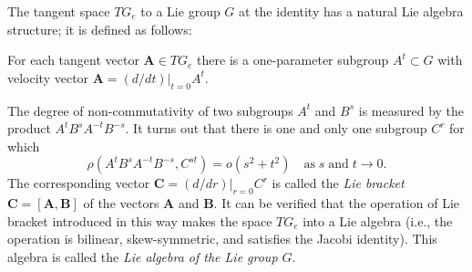 \documentclass[leqno]{report}
\numberwithin{equation}{section}
\theoremstyle{plain}
\theoremstyle{definition}
\theoremstyle{remark}
\theoremstyle{smallcap}
\numberwithin{prob}{section}
\begin{document}
The tangent space $TG_e$ to a Lie group $G$
at the identity has a natural Lie algebra structure;
it is defined as follows:

For each tangent vector $\mathbf A \in TG_e$
there is a one-parameter subgroup $A^t \subset G$
with velocity vector $\mathbf A = (d/dt)|_{t = 0} A^t$.

The degree of non-commutativity of two subgroups $A^t$ and $B^s$
is measured by the product $A^tB^sA^{-t}B^{-s}$.
%
It turns out that there is one and only one subgroup $C^r$ for which
$$
\rho(A^tB^sA^{-t}B^{-s}, C^{st}) = o(s^2 + t^2)
\quad
\mathrm{as \;}
s \mathrm{\; and \;} t \to 0.
$$
The corresponding vector $\mathbf C =(d/dr)|_{r = 0} C^r$
is called the \emph{Lie bracket}
%
$\mathbf C = [\mathbf A, \mathbf B]$
of the vectors $\mathbf A$ and $\mathbf B$.
%
It can be verified that the operation of Lie bracket
introduced in this way makes the space $TG_e$
into a Lie algebra (i.e., the operation
is bilinear, skew-symmetric, and satisfies the
Jacobi identity).
%
This algebra is called the \emph{Lie algebra of the Lie group $G$}.
\end{document}
